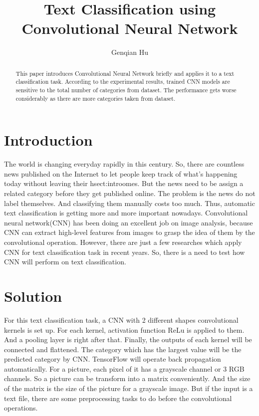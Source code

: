 \documentclass[12pt]{spieman}
\title{Text Classification using Convolutional Neural Network}
\author[a]{Genqian Hu}
\affil[a]{George Mason University}
\begin{document}
\maketitle

\begin{abstract}
This paper introduces Convolutional Neural Network briefly and applies it to a text classification task. According to the experimental results, trained CNN models are sensitive to the total number of categories from dataset. The performance gets worse considerably as there are more categories taken from dataset.
\end{abstract}


\begin{spacing}{1.5}   %

\section{Introduction}
The world is changing everyday rapidly in this century. So, there are countless news published on the Internet to let people keep track of what's happening today without leaving their hsect:introomes. But the news need to be assign a related category before they get published online. The problem is the news do not label themselves. And classifying them manually costs too much. Thus, automatic text classification is getting more and more important nowadays.
\newline
Convolutional neural network(CNN) has been doing an excellent job on image analysis, because CNN can extract high-level features from images to grasp the idea of them by the convolutional operation. However, there are just a few researches which apply CNN for text classification task in recent years.\cite{ref2} \cite{ref3}\cite{ref4} So, there is a need to test how CNN will perform on text classification.



\section{Solution}
For this text classification task, a CNN with 2 different shapes convolutional kernels is set up. For each kernel, activation function ReLu is applied to them. And a pooling layer is right after that. Finally, the outputs of each kernel will be connected and flattened. The category which has the largest value will be the predicted category by CNN. TensorFlow will operate back propagation automatically.
\newline
For a picture, each pixel of it has a grayscale channel or 3 RGB channels. So a picture can be transform into a matrix conveniently. And the size of the matrix is the size of the picture for a grayscale image. But if the input is a text file, there are some preprocessing tasks to do before the convolutional operations.



\end{spacing}
\end{document}
